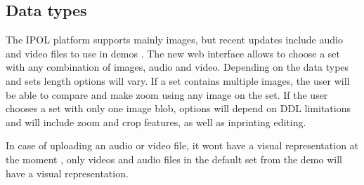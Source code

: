 
\subsection{Data types}
The IPOL platform supports mainly images, but recent updates include audio and video files to use in demos . The new web interface 
allows to choose a set with any combination of images, audio and video. Depending on the data types and sets length options will vary. 
If a set contains multiple images, the user will be able to compare and make zoom using any image on the set. If the user chooses a set with only 
one image blob, options will depend on DDL limitations and will include zoom and crop features, as well as inprinting editing.

In case of uploading an audio or video file, it wont have a visual representation at the moment , only videos and audio files in the default set from the demo will have a visual representation.

